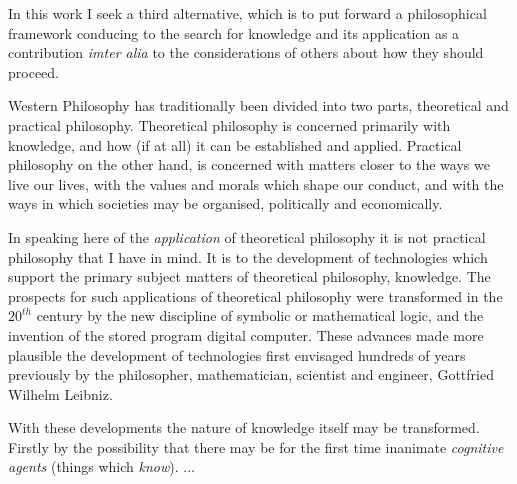 In this work I seek a third alternative, which is to put forward a
philosophical framework conducing to the search for knowledge and its
application as a contribution \emph{imter alia} to the considerations
of others about how they should proceed.

Western Philosophy has traditionally been divided into two parts,
theoretical and practical philosophy.
Theoretical philosophy is concerned primarily with knowledge, and how
(if at all) it can be established and applied.
Practical philosophy on the other hand, is concerned with matters
closer to the ways we live our lives, with the values and morals which
shape our conduct, and with the ways in which societies may be
organised, politically and economically.

In speaking here of the \emph{application} of theoretical philosophy
it is not practical philosophy that I have in mind.
It is to the development of technologies which support the primary
subject matters of theoretical philosophy, knowledge.
The prospects for such applications of theoretical philosophy were
transformed in the $20^{th}$ century by the new discipline of symbolic
or mathematical logic, and the invention of the stored program digital
computer.
These advances made more plausible the development of technologies
first envisaged hundreds of years previously by the philosopher,
mathematician, scientist and engineer, Gottfried Wilhelm Leibniz.

With these developments the nature of knowledge itself may be
transformed.
Firstly by the possibility that there may be for the first time
inanimate \emph{cognitive agents} (things which \emph{know}).
...

\mainmatter
